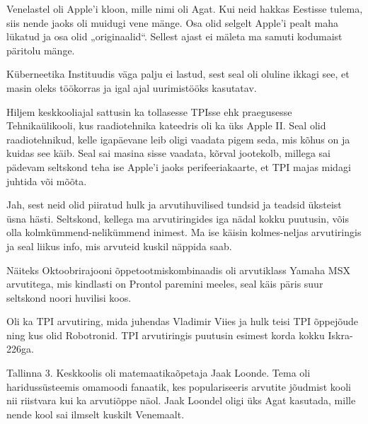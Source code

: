 Venelastel oli Apple'i kloon, mille nimi oli Agat. 
Kui neid hakkas Eestisse tulema, siis nende jaoks oli muidugi vene 
mänge. Osa olid selgelt Apple'i pealt maha lükatud ja osa olid 
„originaalid“. Sellest ajast ei mäleta ma samuti kodumaist päritolu mänge.


Küberneetika Instituudis väga palju 
ei lastud, sest seal oli oluline ikkagi see, et masin oleks töökorras ja igal 
ajal uurimistööks kasutatav.

Hiljem keskkooliajal sattusin ka tollasesse TPIsse ehk 
praegusesse Tehnikaülikooli, kus raadiotehnika 
kateedris oli ka üks Apple II. Seal olid 
raadiotehnikud, kelle igapäevane leib oligi vaadata pigem 
seda, mis kõhus on ja kuidas see käib. Seal sai masina sisse vaadata, 
kõrval jootekolb, millega sai pädevam seltskond teha ise Apple'i 
jaoks perifeeriakaarte, et TPI majas midagi juhtida või mõõta. 


Jah, sest neid olid piiratud hulk ja arvutihuvilised 
tundsid ja teadsid üksteist üsna hästi. Seltskond, kellega ma arvutiringides iga nädal kokku puutusin, 
võis olla kolmkümmend-nelikümmend inimest. 
Ma ise käisin kolmes-neljas arvutiringis ja seal liikus info, mis arvuteid kuskil näppida saab.

Näiteks Oktoobrirajooni õppetootmiskombinaadis oli arvutiklass Yamaha 
MSX arvutitega, mis kindlasti on Prontol 
paremini meeles, seal käis päris suur seltskond noori huvilisi koos. 

Oli ka TPI arvutiring, mida juhendas 
Vladimir Viies ja hulk teisi TPI õppejõude ning kus 
olid Robotronid. TPI arvutiringis 
puutusin esimest korda kokku Iskra-226ga.

Tallinna 3. Keskkoolis oli matemaatikaõpetaja Jaak Loonde. Tema oli haridussüsteemis omamoodi fanaatik, kes populariseeris 
arvutite jõudmist kooli nii riistvara kui ka arvutiõppe näol. Jaak Loondel oligi üks 
Agat kasutada, mille nende kool sai ilmselt kuskilt Venemaalt. 

